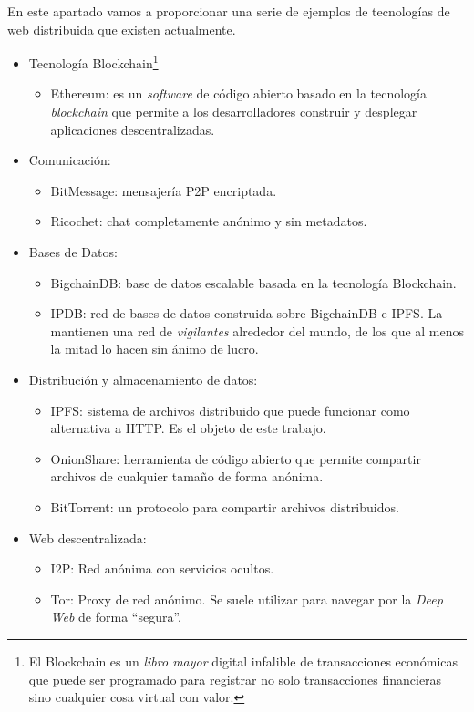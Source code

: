 \documentclass[12pt]{article} %
\begin{document}
En este apartado vamos a proporcionar una serie de ejemplos de tecnologías de web distribuida que existen actualmente.
\begin{itemize}
  \item Tecnología Blockchain\footnote{El Blockchain es un \textit{libro mayor} digital infalible de transacciones económicas que puede ser programado para registrar no solo transacciones financieras sino cualquier cosa virtual con valor.\cite{blockchain-technology}}
  \begin{itemize}
    \item Ethereum: es un \textit{software} de código abierto basado en la tecnología \textit{blockchain} que permite a los desarrolladores construir y desplegar aplicaciones descentralizadas.
  \end{itemize}
  \item Comunicación:
  \begin{itemize}
    \item BitMessage: mensajería P2P encriptada.
    \item Ricochet: chat completamente anónimo y sin metadatos.
  \end{itemize}
  \item Bases de Datos:
  \begin{itemize}
    \item BigchainDB: base de datos escalable basada en la tecnología Blockchain.
    \item IPDB: red de bases de datos construida sobre BigchainDB e IPFS. La mantienen una red de \textit{vigilantes} alrededor del mundo, de los que al menos la mitad lo hacen sin ánimo de lucro.
  \end{itemize}
  \item Distribución y almacenamiento de datos:
  \begin{itemize}
    \item IPFS: sistema de archivos distribuido que puede funcionar como alternativa a HTTP. Es el objeto de este trabajo.
    \item OnionShare: herramienta de código abierto que permite compartir archivos de cualquier tamaño de forma anónima.
    \item BitTorrent: un protocolo para compartir archivos distribuidos.
  \end{itemize}
  \item Web descentralizada:
    \begin{itemize}
      \item I2P: Red anónima con servicios ocultos.
      \item Tor: Proxy de red anónimo. Se suele utilizar para navegar por la \textit{Deep Web} de forma ``segura''.

\end{itemize}
\end{itemize}
\end{document}
